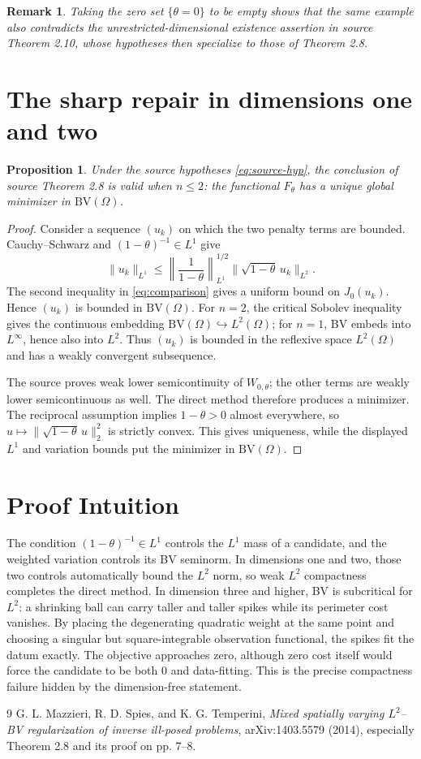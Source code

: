 \documentclass[11pt]{article}
\newtheorem{proposition}{Proposition}
\newtheorem{remark}{Remark}
\newcommand{\BV}{\mathrm{BV}}
\newcommand{\TV}{J_0}
\newcommand{\W}{W_{0,\theta}}
\newcommand{\F}{F_\theta}
\begin{document}
\begin{remark}
Taking the zero set \(\{\theta=0\}\) to be empty shows that the same example
also contradicts the unrestricted-dimensional existence assertion in source
Theorem 2.10, whose hypotheses then specialize to those of Theorem 2.8.
\end{remark}

\section{The sharp repair in dimensions one and two}

\begin{proposition}\label{prop:repair}
Under the source hypotheses \eqref{eq:source-hyp}, the conclusion of source
Theorem 2.8 is valid when \(n\le2\): the functional \(\F\) has a unique
global minimizer in \(\BV(\Omega)\).
\end{proposition}

\begin{proof}
Consider a sequence \((u_k)\) on which the two penalty terms are bounded.
Cauchy--Schwarz and \((1-\theta)^{-1}\in L^1\) give
\[
 \|u_k\|_{L^1}
 \le \left\|\frac1{1-\theta}\right\|_{L^1}^{1/2}
     \|\sqrt{1-\theta}\,u_k\|_{L^2}.
\]
The second inequality in \eqref{eq:comparison} gives a uniform bound on
\(\TV(u_k)\).  Hence \((u_k)\) is bounded in \(\BV(\Omega)\).  For
\(n=2\), the critical Sobolev inequality gives the continuous embedding
\(\BV(\Omega)\hookrightarrow L^2(\Omega)\); for \(n=1\), BV embeds into
\(L^\infty\), hence also into \(L^2\).  Thus \((u_k)\) is bounded in the
reflexive space \(L^2(\Omega)\) and has a weakly convergent subsequence.

The source proves weak lower semicontinuity of \(\W\); the other terms are
weakly lower semicontinuous as well.  The direct method therefore produces
a minimizer.  The reciprocal assumption implies \(1-\theta>0\) almost
everywhere, so \(u\mapsto\|\sqrt{1-\theta}\,u\|_2^2\) is strictly convex.
This gives uniqueness, while the displayed \(L^1\) and variation bounds put
the minimizer in \(\BV(\Omega)\).
\end{proof}

\section*{Proof Intuition}

The condition \((1-\theta)^{-1}\in L^1\) controls the \(L^1\) mass of a
candidate, and the weighted variation controls its BV seminorm.  In
dimensions one and two, those two controls automatically bound the
\(L^2\) norm, so weak \(L^2\) compactness completes the direct method.  In
dimension three and higher, BV is subcritical for \(L^2\): a shrinking ball
can carry taller and taller spikes while its perimeter cost vanishes.  By
placing the degenerating quadratic weight at the same point and choosing a
singular but square-integrable observation functional, the spikes fit the
datum exactly.  The objective approaches zero, although zero cost itself
would force the candidate to be both \(0\) and data-fitting.  This is the
precise compactness failure hidden by the dimension-free statement.

\begin{thebibliography}{9}
G. L. Mazzieri, R. D. Spies, and K. G. Temperini,
\emph{Mixed spatially varying \(L^2\)--BV regularization of inverse
ill-posed problems}, arXiv:1403.5579 (2014), especially Theorem 2.8 and its
proof on pp. 7--8.
\end{thebibliography}
\end{document}
